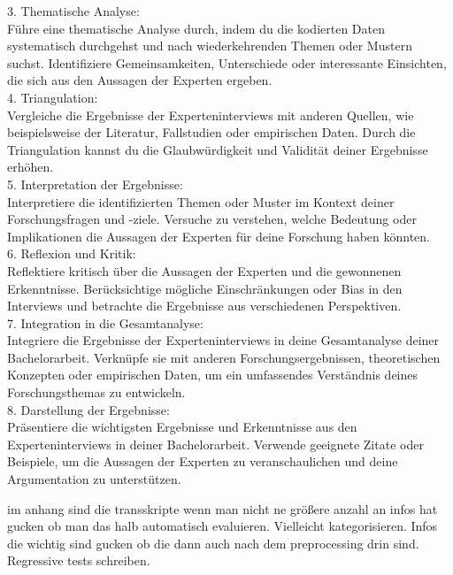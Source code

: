 3. Thematische Analyse:\\
Führe eine thematische Analyse durch, indem du die kodierten Daten systematisch durchgehst und nach wiederkehrenden Themen oder Mustern suchst. Identifiziere Gemeinsamkeiten, Unterschiede oder interessante Einsichten, die sich aus den Aussagen der Experten ergeben.\\

4. Triangulation:\\
Vergleiche die Ergebnisse der Experteninterviews mit anderen Quellen, wie beispielsweise der Literatur, Fallstudien oder empirischen Daten. Durch die Triangulation kannst du die Glaubwürdigkeit und Validität deiner Ergebnisse erhöhen.\\

5. Interpretation der Ergebnisse:\\
Interpretiere die identifizierten Themen oder Muster im Kontext deiner Forschungsfragen und -ziele. Versuche zu verstehen, welche Bedeutung oder Implikationen die Aussagen der Experten für deine Forschung haben könnten.\\

6. Reflexion und Kritik:\\
Reflektiere kritisch über die Aussagen der Experten und die gewonnenen Erkenntnisse. Berücksichtige mögliche Einschränkungen oder Bias in den Interviews und betrachte die Ergebnisse aus verschiedenen Perspektiven.\\

7. Integration in die Gesamtanalyse:\\
Integriere die Ergebnisse der Experteninterviews in deine Gesamtanalyse deiner Bachelorarbeit. Verknüpfe sie mit anderen Forschungsergebnissen, theoretischen Konzepten oder empirischen Daten, um ein umfassendes Verständnis deines Forschungsthemas zu entwickeln.\\

8. Darstellung der Ergebnisse:\\
Präsentiere die wichtigsten Ergebnisse und Erkenntnisse aus den Experteninterviews in deiner Bachelorarbeit. Verwende geeignete Zitate oder Beispiele, um die Aussagen der Experten zu veranschaulichen und deine Argumentation zu unterstützen.
\cite{maguire2002user}

im anhang sind die transskripte
wenn man nicht ne größere anzahl an infos hat gucken ob man das halb automatisch evaluieren. Vielleicht kategorisieren. Infos die wichtig sind gucken ob die dann auch nach dem preprocessing drin sind. Regressive tests schreiben.

